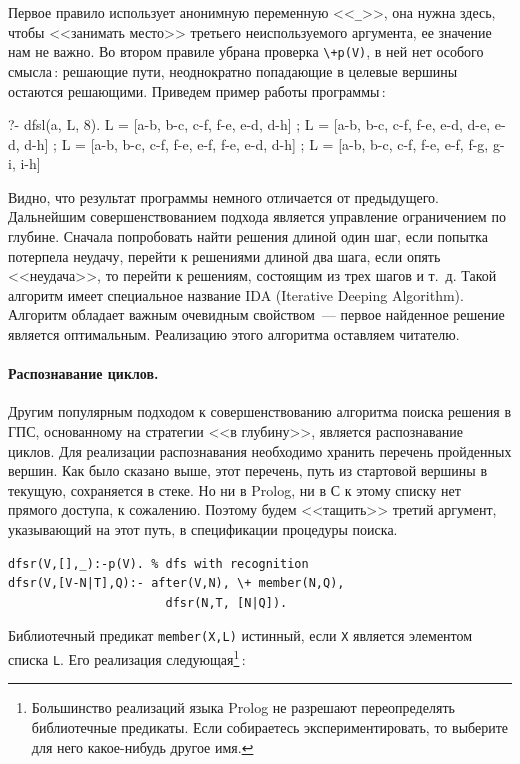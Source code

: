 \documentclass[a4paper,14pt, openany, twoside, draft]{extbook} %
\begin{document}
Первое правило использует анонимную переменную <<\texttt{\_}>>, она нужна здесь, чтобы <<занимать место>> третьего неиспользуемого аргумента, ее значение нам не важно.  Во втором правиле убрана проверка \texttt{\backslash +p(V)}, в ней нет особого смысла\,: решающие пути, неоднократно попадающие в целевые вершины остаются решающими.  Приведем пример работы программы\,:

\begin{proexp}
?- dfsl(a, L, 8).
L = [a-b, b-c, c-f, f-e, e-d, d-h] ;
L = [a-b, b-c, c-f, f-e, e-d, d-e, e-d, d-h] ;
L = [a-b, b-c, c-f, f-e, e-f, f-e, e-d, d-h] ;
L = [a-b, b-c, c-f, f-e, e-f, f-g, g-i, i-h]
\end{proexp}


Видно, что результат программы немного отличается от предыдущего.  Дальнейшим совершенствованием подхода является управление ограничением по глубине.  Сначала попробовать найти решения длиной один шаг, если попытка потерпела неудачу, перейти к решениями длиной два шага, если опять <<неудача>>, то перейти к решениям, состоящим из трех шагов и т.~д.  Такой алгоритм имеет специальное название IDA (\foreignlanguage{english}{Iterative Deeping Algorithm}).  Алгоритм обладает важным очевидным свойством~--- первое найденное решение является оптимальным.  Реализацию этого алгоритма оставляем читателю.

\paragraph{Распознавание циклов.}  Другим популярным подходом к совершенствованию алгоритма поиска решения в ГПС, основанному на стратегии <<в глубину>>, является распознавание циклов.  Для реализации распознавания необходимо хранить перечень пройденных вершин.  Как было сказано выше, этот перечень, путь из стартовой вершины в текущую, сохраняется в стеке.  Но ни в Prolog, ни в С к этому списку нет прямого доступа, к сожалению.  Поэтому будем <<тащить>> третий аргумент, указывающий на этот путь, в спецификации процедуры поиска.

\begin{verbatim}
dfsr(V,[],_):-p(V). % dfs with recognition
dfsr(V,[V-N|T],Q):- after(V,N), \+ member(N,Q),
                      dfsr(N,T, [N|Q]).
\end{verbatim}


Библиотечный предикат \texttt{member(X,L)} истинный, если \texttt{X} является элементом списка \texttt{L}.  Его реализация следующая\footnote{Большинство реализаций языка Prolog не разрешают переопределять библиотечные предикаты.  Если собираетесь экспериментировать, то выберите для него какое-нибудь другое имя.}\,:
\end{document}
